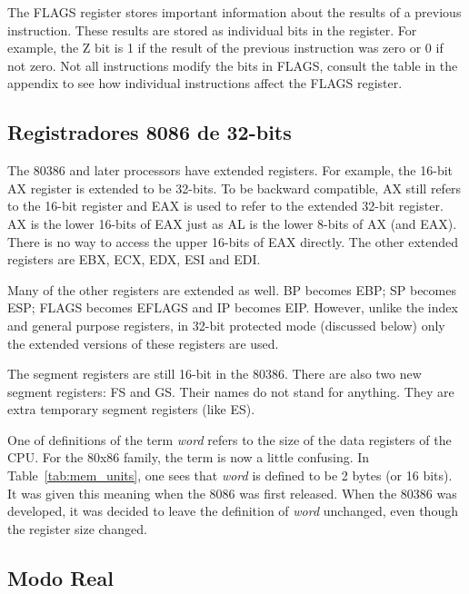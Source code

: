 The FLAGS  register stores important information
about the results of a previous instruction. These results are stored
as individual bits in the register. For example, the Z bit is 1 if the
result of the previous instruction was zero or 0 if not zero. Not all
instructions modify the bits in FLAGS, consult the table in the
appendix to see how individual instructions affect the FLAGS register.

\subsection{Registradores 8086 de 32-bits}

The 80386 and later processors have extended registers. For example, the
16-bit AX register is extended to be 32-bits. To be backward compatible, AX
still refers to the 16-bit register and EAX is used to refer to the extended
32-bit register. AX is the lower 16-bits of EAX just as AL is the lower 8-bits
of AX (and EAX). There is no way to access the upper 16-bits of EAX directly.
The other extended registers are EBX, ECX, EDX, ESI and EDI.

Many of the other registers are extended as well. BP becomes
EBP; SP becomes ESP; FLAGS becomes EFLAGS and IP becomes
EIP. However, unlike the index and general purpose
registers, in 32-bit protected mode (discussed below) only the
extended versions of these registers are used.

The segment registers are still 16-bit in the 80386. There are also
two new segment registers: FS and GS. Their
names do not stand for anything. They are extra temporary segment
registers (like ES).

One of definitions of the term \emph{word}  refers to the
size of the data registers of the CPU. For the 80x86 family, the term
is now a little confusing. In Table~\ref{tab:mem_units}, one sees that
\emph{word} is defined to be 2 bytes (or 16 bits). It was given this
meaning when the 8086 was first released. When the 80386 was
developed, it was decided to leave the definition of \emph{word}
unchanged, even though the register size changed.

\subsection{Modo Real \label{modo_real} }

